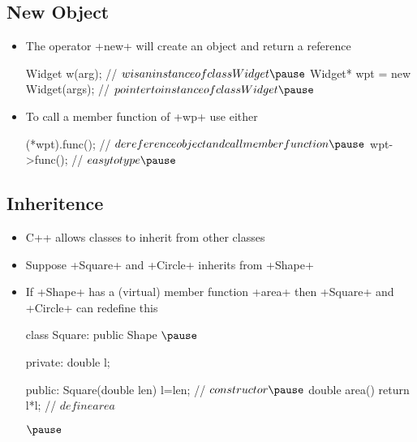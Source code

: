 
\begin{slide}
\section{New Object}
  
\begin{PauseHighLight}
  \begin{itemize}
  \item The operator \jl+new+ will create an object and return a
    reference
    \begin{cpp}
Widget w(arg);                  // $w is an instance of class Widget\pause$
Widget* wpt = new Widget(args); // $pointer to instance of class Widget\pause$
    \end{cpp}
  \item To call a member function of \jl+wp+ use either
    \begin{cpp}
(*wpt).func();  // $dereference object and call member function\pause$
wpt->func();    // $easy to type\pause$
    \end{cpp}
  \end{itemize}
\end{PauseHighLight}

\end{slide}


\begin{slide}
\section[-2]{Inheritence}

\begin{PauseHighLight}
  \begin{itemize}
  \item C++ allows classes to inherit from other classes\pause
  \item Suppose \jl+Square+ and \jl+Circle+ inherits from \jl+Shape+
  \item If \jl+Shape+ has a (virtual) member function \jl+area+ then
    \jl+Square+ and \jl+Circle+ can redefine this
    \begin{cpp}
      class Square: public Shape $\pause${
        private:
          double l;

        public:
          Square(double len) {l=len;}  // $constructor\pause$
          double area() {return l*l;}  // $define area$
      }$\pause$
    \end{cpp}
  \end{itemize}
\end{PauseHighLight}

\end{slide}


